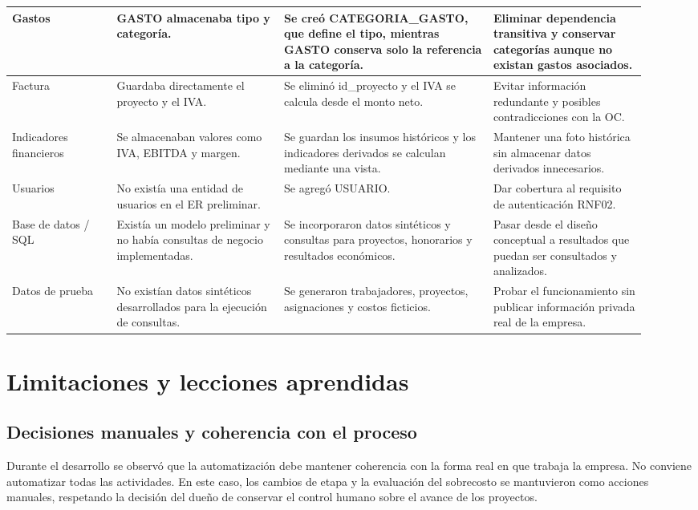 \documentclass[11pt,letterpaper]{article}
\begin{document}
\begin{longtable}{|>{\RaggedRight\arraybackslash}p{0.155\linewidth}|>{\RaggedRight\arraybackslash}p{0.245\linewidth}|>{\RaggedRight\arraybackslash}p{0.3\linewidth}|>{\RaggedRight\arraybackslash}p{0.225\linewidth}|}
Gastos & GASTO almacenaba tipo y categoría. & Se creó CATEGORIA\_GASTO, que define el tipo, mientras GASTO conserva solo la referencia a la categoría. & Eliminar dependencia transitiva y conservar categorías aunque no existan gastos asociados. \\ \hline
Factura & Guardaba directamente el proyecto y el IVA. & Se eliminó id\_proyecto y el IVA se calcula desde el monto neto. & Evitar información redundante y posibles contradicciones con la OC. \\ \hline
Indicadores financieros & Se almacenaban valores como IVA, EBITDA y margen. & Se guardan los insumos históricos y los indicadores derivados se calculan mediante una vista. & Mantener una foto histórica sin almacenar datos derivados innecesarios. \\ \hline
Usuarios & No existía una entidad de usuarios en el ER preliminar. & Se agregó USUARIO. & Dar cobertura al requisito de autenticación RNF02. \\ \hline
Base de datos / SQL & Existía un modelo preliminar y no había consultas de negocio implementadas. & Se incorporaron datos sintéticos y consultas para proyectos, honorarios y resultados económicos. & Pasar desde el diseño conceptual a resultados que puedan ser consultados y analizados. \\ \hline
Datos de prueba & No existían datos sintéticos desarrollados para la ejecución de consultas. & Se generaron trabajadores, proyectos, asignaciones y costos ficticios. & Probar el funcionamiento sin publicar información privada real de la empresa. \\ \hline
\end{longtable}
\endgroup


\section{Limitaciones y lecciones aprendidas}


\subsection{Decisiones manuales y coherencia con el proceso}

Durante el desarrollo se observó que la automatización debe mantener coherencia con la forma real en que trabaja la empresa. No conviene automatizar todas las actividades. En este caso, los cambios de etapa y la evaluación del sobrecosto se mantuvieron como acciones manuales, respetando la decisión del dueño de conservar el control humano sobre el avance de los proyectos.
\end{document}
